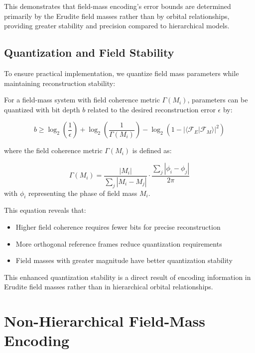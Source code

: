 This demonstrates that field-mass encoding's error bounds are determined primarily by the Erudite field masses rather than by orbital relationships, providing greater stability and precision compared to hierarchical models.

\subsection{Quantization and Field Stability}

To ensure practical implementation, we quantize field mass parameters while maintaining reconstruction stability:

\begin{proposition}
For a field-mass system with field coherence metric $\Gamma(M_i)$, parameters can be quantized with bit depth $b$ related to the desired reconstruction error $\epsilon$ by:

\begin{equation}
b \geq \log_2\left(\frac{1}{\epsilon}\right) + \log_2\left(\frac{1}{\Gamma(M_i)}\right) - \log_2\left(1 - |\langle \mathcal{F}_E|\mathcal{F}_M \rangle|^2\right)
\end{equation}

where the field coherence metric $\Gamma(M_i)$ is defined as:

\begin{equation}
\Gamma(M_i) = \frac{|M_i|}{\sum_j |M_i - M_j|} \cdot \frac{\sum_j |\phi_i - \phi_j|}{2\pi}
\end{equation}
with $\phi_i$ representing the phase of field mass $M_i$.
\end{proposition}

This equation reveals that:
\begin{itemize}
    \item Higher field coherence requires fewer bits for precise reconstruction
    \item More orthogonal reference frames reduce quantization requirements
    \item Field masses with greater magnitude have better quantization stability
\end{itemize}

This enhanced quantization stability is a direct result of encoding information in Erudite field masses rather than in hierarchical orbital relationships.

\section{Non-Hierarchical Field-Mass Encoding}

